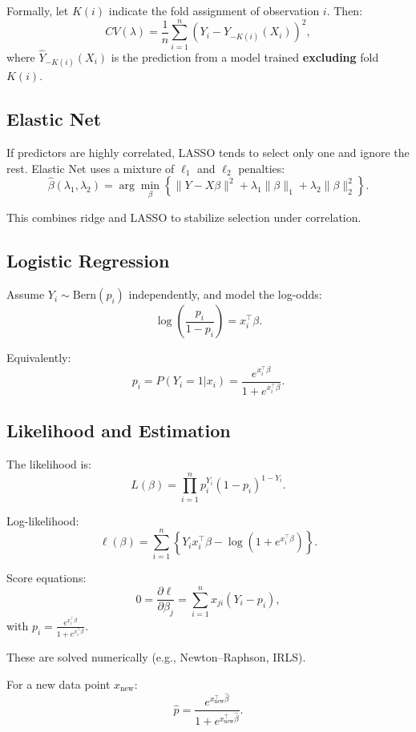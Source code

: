 Formally, let $K(i)$ indicate the fold assignment of observation $i$. Then:
\[
    CV(\lambda)
    = \frac{1}{n} \sum_{i=1}^n 
        (Y_i - \hat{Y}_{-K(i)}(X_i))^2,
\]
where $\hat{Y}_{-K(i)}(X_i)$ is the prediction from a model trained \textbf{excluding} fold $K(i)$.

\subsection{Elastic Net}

If predictors are highly correlated, LASSO tends to select only one and ignore the rest.  
Elastic Net uses a mixture of $\ell_1$ and $\ell_2$ penalties:
\[
    \hat{\beta}(\lambda_1,\lambda_2)
    =
    \arg\min_{\beta}
        \left\{
            \|Y - X\beta\|^2
            + \lambda_1 \|\beta\|_1
            + \lambda_2 \|\beta\|_2^2
        \right\}.
\]

This combines ridge and LASSO to stabilize selection under correlation.

\subsection{Logistic Regression}

Assume $Y_i \sim \text{Bern}(p_i)$ independently, and model the log-odds:
\[
    \log\left( \frac{p_i}{1 - p_i} \right)
    = x_i^{\top} \beta.
\]

Equivalently:
\[
    p_i = P(Y_i = 1 | x_i)
    = \frac{e^{x_i^{\top} \beta}}{1 + e^{x_i^{\top} \beta}}.
\]

\subsection{Likelihood and Estimation}

The likelihood is:
\[
    L(\beta)
    = \prod_{i=1}^n p_i^{Y_i} (1 - p_i)^{1 - Y_i}.
\]

Log-likelihood:
\[
    \ell(\beta)
    = \sum_{i=1}^n \left\{ 
        Y_i x_i^{\top} \beta
        - \log(1 + e^{x_i^{\top} \beta})
    \right\}.
\]

Score equations:
\[
    0 = \frac{\partial \ell}{\partial \beta_j}
    = \sum_{i=1}^n x_{ji}(Y_i - p_i),
\]
with $p_i = \frac{e^{x_i^\top \beta}}{1 + e^{x_i^\top\beta}}$.

These are solved numerically (e.g., Newton–Raphson, IRLS).

For a new data point $x_{\text{new}}$:
\[
    \hat{p}
    = \frac{e^{x_{\text{new}}^{\top} \hat{\beta}}}
           {1 + e^{x_{\text{new}}^{\top} \hat{\beta}}}.
\]

